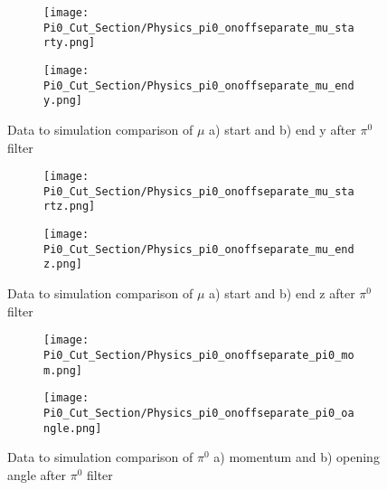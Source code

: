 \begin{figure}[t!]
\centering
  \begin{subfigure}[t]{0.3\textwidth}
    \centering
\texttt{[image: Pi0\_Cut\_Section/Physics\_pi0\_onoffseparate\_mu\_starty.png]}
  \caption{ }
  \end{subfigure} 
  \hspace{30mm}
  \begin{subfigure}[t]{0.3\textwidth}
    \centering
\texttt{[image: Pi0\_Cut\_Section/Physics\_pi0\_onoffseparate\_mu\_endy.png]}
  \caption{ }
  \end{subfigure} 
\caption{ Data to simulation comparison of $\mu$ a) start and b) end y after $\pi^0$ filter }
\label{fig:physics_pi0_mu_y}
\end{figure}

\begin{figure}[t!]
\centering
  \begin{subfigure}[t]{0.3\textwidth}
    \centering
\texttt{[image: Pi0\_Cut\_Section/Physics\_pi0\_onoffseparate\_mu\_startz.png]}
  \caption{ }
  \end{subfigure} 
  \hspace{30mm}
  \begin{subfigure}[t]{0.3\textwidth}
    \centering
\texttt{[image: Pi0\_Cut\_Section/Physics\_pi0\_onoffseparate\_mu\_endz.png]}
  \caption{ }
  \end{subfigure} 
\caption{ Data to simulation comparison of $\mu$ a) start and b) end z after $\pi^0$ filter }
\label{fig:physics_pi0_mu_z}
\end{figure}

\begin{figure}[h!]
\centering
  \begin{subfigure}[t]{0.3\textwidth}
    \centering
\texttt{[image: Pi0\_Cut\_Section/Physics\_pi0\_onoffseparate\_pi0\_mom.png]}
  \caption{ }
  \end{subfigure} 
  \hspace{30mm}
  \begin{subfigure}[t]{0.3\textwidth}
    \centering
\texttt{[image: Pi0\_Cut\_Section/Physics\_pi0\_onoffseparate\_pi0\_oangle.png]} 
  \caption{ }
  \end{subfigure} 
\label{fig:physics_pi0_pi0_oangle}
\caption{ Data to simulation comparison of $\pi^0$ a) momentum and b) opening angle after $\pi^0$ filter }
\end{figure}

